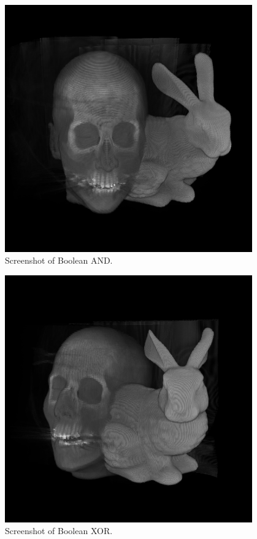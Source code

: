 \documentclass{article}
\begin{document}
\begin{figure}
\centering
\includegraphics[width=0.95\textwidth]{boolean-and-screenshot-2.png}
\caption{Screenshot of Boolean AND.}
\end{figure}

\begin{figure}
\centering
\includegraphics[width=0.95\textwidth]{boolean-xor-screenshot-2.png}
\caption{Screenshot of Boolean XOR.}
\end{figure}
\end{document}
